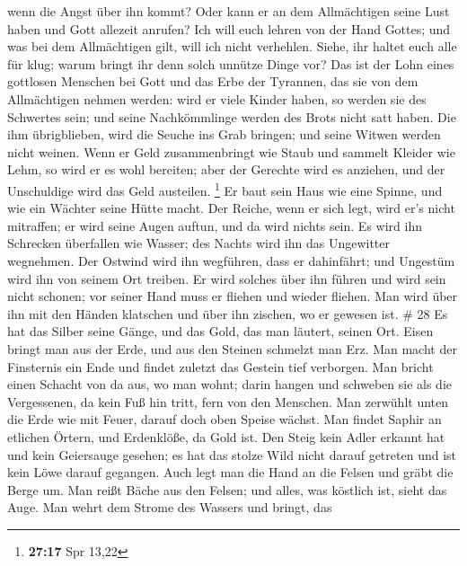 wenn die Angst über ihn kommt?  Oder kann er an dem
Allmächtigen seine Lust haben und Gott allezeit anrufen? 
Ich will euch lehren von der Hand Gottes; und was bei dem Allmächtigen
gilt, will ich nicht verhehlen.  Siehe, ihr haltet euch
alle für klug; warum bringt ihr denn solch unnütze Dinge vor?
 Das ist der Lohn eines gottlosen Menschen bei Gott und
das Erbe der Tyrannen, das sie von dem Allmächtigen nehmen werden:
 wird er viele Kinder haben, so werden sie des Schwertes
sein; und seine Nachkömmlinge werden des Brots nicht satt haben.
 Die ihm übrigblieben, wird die Seuche ins Grab bringen;
und seine Witwen werden nicht weinen.  Wenn er Geld
zusammenbringt wie Staub und sammelt Kleider wie Lehm, 
so wird er es wohl bereiten; aber der Gerechte wird es anziehen, und der
Unschuldige wird das Geld austeilen. \footnote{\textbf{27:17} Spr 13,22}
 Er baut sein Haus wie eine Spinne, und wie ein Wächter
seine Hütte macht.  Der Reiche, wenn er sich legt, wird
er's nicht mitraffen; er wird seine Augen auftun, und da wird nichts
sein.  Es wird ihn Schrecken überfallen wie Wasser; des
Nachts wird ihn das Ungewitter wegnehmen.  Der Ostwind
wird ihn wegführen, dass er dahinfährt; und Ungestüm wird ihn von seinem
Ort treiben.  Er wird solches über ihn führen und wird
sein nicht schonen; vor seiner Hand muss er fliehen und wieder fliehen.
 Man wird über ihn mit den Händen klatschen und über ihn
zischen, wo er gewesen ist. \# 28  Es hat das Silber seine
Gänge, und das Gold, das man läutert, seinen Ort.  Eisen
bringt man aus der Erde, und aus den Steinen schmelzt man Erz.
 Man macht der Finsternis ein Ende und findet zuletzt das
Gestein tief verborgen.  Man bricht einen Schacht von da
aus, wo man wohnt; darin hangen und schweben sie als die Vergessenen, da
kein Fuß hin tritt, fern von den Menschen.  Man zerwühlt
unten die Erde wie mit Feuer, darauf doch oben Speise wächst.
 Man findet Saphir an etlichen Örtern, und Erdenklöße, da
Gold ist.  Den Steig kein Adler erkannt hat und kein
Geiersauge gesehen;  es hat das stolze Wild nicht darauf
getreten und ist kein Löwe darauf gegangen.  Auch legt man
die Hand an die Felsen und gräbt die Berge um.  Man reißt
Bäche aus den Felsen; und alles, was köstlich ist, sieht das Auge.
 Man wehrt dem Strome des Wassers und bringt, das
